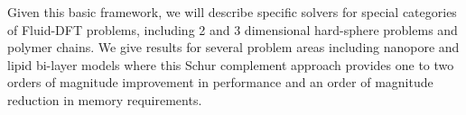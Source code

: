 \documentclass{report}
\begin{document}
Given this basic framework, we will describe specific
solvers for special categories of Fluid-DFT problems,
including 2 and 3 dimensional hard-sphere problems and
polymer chains. We give results for several problem areas
including nanopore and lipid bi-layer models where this
Schur complement approach provides one to two orders of
magnitude improvement in performance and an order of
magnitude reduction in memory requirements.



\end{document}
